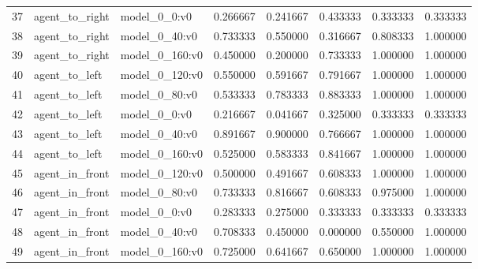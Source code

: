 \begin{tabular}{lllrrrrr}
37 & agent\_to\_right & model\_0\_0:v0 & 0.266667 & 0.241667 & 0.433333 & 0.333333 & 0.333333 \\
38 & agent\_to\_right & model\_0\_40:v0 & 0.733333 & 0.550000 & 0.316667 & 0.808333 & 1.000000 \\
39 & agent\_to\_right & model\_0\_160:v0 & 0.450000 & 0.200000 & 0.733333 & 1.000000 & 1.000000 \\
40 & agent\_to\_left & model\_0\_120:v0 & 0.550000 & 0.591667 & 0.791667 & 1.000000 & 1.000000 \\
41 & agent\_to\_left & model\_0\_80:v0 & 0.533333 & 0.783333 & 0.883333 & 1.000000 & 1.000000 \\
42 & agent\_to\_left & model\_0\_0:v0 & 0.216667 & 0.041667 & 0.325000 & 0.333333 & 0.333333 \\
43 & agent\_to\_left & model\_0\_40:v0 & 0.891667 & 0.900000 & 0.766667 & 1.000000 & 1.000000 \\
44 & agent\_to\_left & model\_0\_160:v0 & 0.525000 & 0.583333 & 0.841667 & 1.000000 & 1.000000 \\
45 & agent\_in\_front & model\_0\_120:v0 & 0.500000 & 0.491667 & 0.608333 & 1.000000 & 1.000000 \\
46 & agent\_in\_front & model\_0\_80:v0 & 0.733333 & 0.816667 & 0.608333 & 0.975000 & 1.000000 \\
47 & agent\_in\_front & model\_0\_0:v0 & 0.283333 & 0.275000 & 0.333333 & 0.333333 & 0.333333 \\
48 & agent\_in\_front & model\_0\_40:v0 & 0.708333 & 0.450000 & 0.000000 & 0.550000 & 1.000000 \\
49 & agent\_in\_front & model\_0\_160:v0 & 0.725000 & 0.641667 & 0.650000 & 1.000000 & 1.000000 \\
\bottomrule
\end{tabular}
